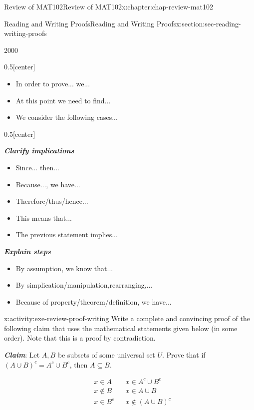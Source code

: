 \documentclass[oneside,10pt,]{book}
\newcommand{\alert}[1]{\textbf{\textit{#1}}}
\numberwithin{equation}{section}
\newcommand{\amp}{&}
\begin{document}
\begin{chapterptx}{Review of MAT102}{}{Review of MAT102}{}{}{x:chapter:chap-review-mat102}
\begin{sectionptx}{Reading and Writing Proofs}{}{Reading and Writing Proofs}{}{}{x:section:sec-reading-writing-proofs}
\begin{sidebyside}{2}{0}{0}{0}
\begin{sbspanel}{0.5}[center]
\begin{itemize}[label=\textbullet]
\item{}In order to prove... we...%
\item{}At this point we need to find...%
\item{}We consider the following cases...%
\end{itemize}
%
\end{sbspanel}%
\begin{sbspanel}{0.5}[center]%
\par
\alert{Clarify implications}%
\begin{itemize}[label=\textbullet]
\item{}Since... then...%
\item{}Because..., we have...%
\item{}Therefore\slash{}thus\slash{}hence...%
\item{}This means that...%
\item{}The previous statement implies...%
\end{itemize}
%
\end{sbspanel}%
\end{sidebyside}%
\par
\alert{Explain steps}%
\begin{itemize}[label=\textbullet]
\item{}By assumption, we know that...%
\item{}By simplication\slash{}manipulation,rearranging,...%
\item{}Because of property\slash{}theorem\slash{}definition, we have...%
\end{itemize}
%
\begin{activity}{}{x:activity:exe-review-proof-writing}%
Write a complete and convincing proof of the following claim that uses the mathematical statements given below (in some order). Note that this is a proof by contradiction.%
\par
\alert{Claim}: Let \(A, B\) be subsets of some universal set \(U\). Prove that if \((A \cup B)^c = A^c \cup B^c\), then \(A \subseteq B\).%
\par
%
\begin{align*}
\amp x \in A \amp \amp x \in A^c \cup B^c\\
\amp x \not\in B \amp \amp x \in A \cup B\\
\amp x \in B^c \amp \amp x \not\in (A \cup B)^c
\end{align*}
%
\end{activity}
\end{sectionptx}
\end{chapterptx}
\end{document}
